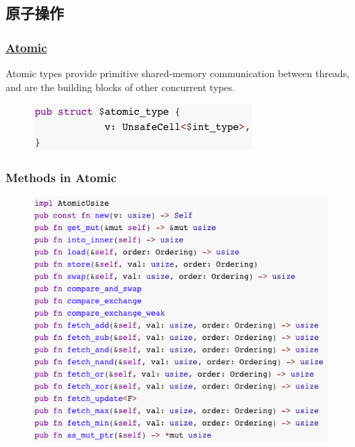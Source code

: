\subsection{原子操作} %
\begin{frame}[fragile]
    \frametitle{\href{https://doc.rust-lang.org/core/sync/atomic/index.html}{Atomic}}

Atomic types provide primitive shared-memory communication between threads, and are the building blocks of other concurrent types.

    \begin{figure}
    \includegraphics[width=0.8\linewidth]{figs/struct-atomic.png}
    \end{figure}

\end{frame}
% 
% 
% 
% 
% 
\begin{frame}[fragile]
    \frametitle{Methods in Atomic}
    \begin{figure}
    \includegraphics[width=0.8\linewidth]{figs/methods-atomic.png}
    \end{figure}

\end{frame}
